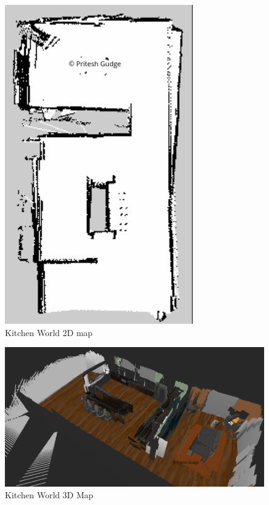 \documentclass[10pt,journal,compsoc]{IEEEtran}
\begin{document}
\begin{figure}[thpb]
      \centering
      \includegraphics[width=\linewidth]{images/kitchen2dmap}
      \caption{Kitchen World 2D map}
      \label{fig:kitchen2d}
\end{figure}


\begin{figure}[thpb]
      \centering
      \includegraphics[width=\linewidth]{images/3dmap2}
      \caption{Kitchen World 3D Map}
      \label{fig:kitchen3d}
\end{figure}
\end{document}
